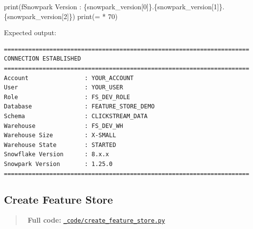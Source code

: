 \documentclass[
  letterpaper,
  DIV=11,
  numbers=noendperiod]{scrreprt}
\newenvironment{Shaded}{\begin{snugshade}}{\end{snugshade}}
\newcommand{\BuiltInTok}[1]{\textcolor[rgb]{0.00,0.23,0.31}{#1}}
\newcommand{\DecValTok}[1]{\textcolor[rgb]{0.68,0.00,0.00}{#1}}
\newcommand{\NormalTok}[1]{\textcolor[rgb]{0.00,0.23,0.31}{#1}}
\newcommand{\OperatorTok}[1]{\textcolor[rgb]{0.37,0.37,0.37}{#1}}
\newcommand{\SpecialCharTok}[1]{\textcolor[rgb]{0.37,0.37,0.37}{#1}}
\newcommand{\SpecialStringTok}[1]{\textcolor[rgb]{0.13,0.47,0.30}{#1}}
\newcommand{\StringTok}[1]{\textcolor[rgb]{0.13,0.47,0.30}{#1}}
\begin{document}
\begin{Shaded}
\begin{Highlighting}[]
\BuiltInTok{print}\NormalTok{(}\SpecialStringTok{f\textquotesingle{}Snowpark Version       : }\SpecialCharTok{\{}\NormalTok{snowpark\_version[}\DecValTok{0}\NormalTok{]}\SpecialCharTok{\}}\SpecialStringTok{.}\SpecialCharTok{\{}\NormalTok{snowpark\_version[}\DecValTok{1}\NormalTok{]}\SpecialCharTok{\}}\SpecialStringTok{.}\SpecialCharTok{\{}\NormalTok{snowpark\_version[}\DecValTok{2}\NormalTok{]}\SpecialCharTok{\}}\SpecialStringTok{\textquotesingle{}}\NormalTok{)}
\BuiltInTok{print}\NormalTok{(}\StringTok{\textquotesingle{}=\textquotesingle{}} \OperatorTok{*} \DecValTok{70}\NormalTok{)}
\end{Highlighting}
\end{Shaded}

Expected output:

\begin{verbatim}
======================================================================
CONNECTION ESTABLISHED
======================================================================
Account                : YOUR_ACCOUNT
User                   : YOUR_USER
Role                   : FS_DEV_ROLE
Database               : FEATURE_STORE_DEMO
Schema                 : CLICKSTREAM_DATA
Warehouse              : FS_DEV_WH
Warehouse Size         : X-SMALL
Warehouse State        : STARTED
Snowflake Version      : 8.x.x
Snowpark Version       : 1.25.0
======================================================================
\end{verbatim}

\hypertarget{create-feature-store}{%
\subsection{Create Feature Store}\label{create-feature-store}}

\begin{quote}
📁 \textbf{Full code:}
\href{_code/create_feature_store.py}{\texttt{\_code/create\_feature\_store.py}}
\end{quote}
\end{document}
